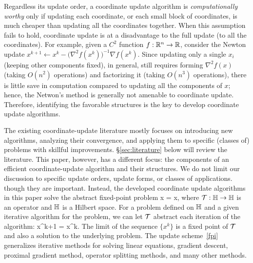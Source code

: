 Regardless its update order, a coordinate update algorithm is \emph{computationally worthy} only if updating each coordinate, or each small block of coordinates, is much cheaper than updating all the coordinates together. When this assumption fails to hold, coordinate update is at a disadvantage to the full update (to all the coordinates). For example, given a $C^2$ function $f:\mathbb{R}^n\to \mathbb{R}$, consider the Newton update  $x^{k+1} \gets x^k - \big(\nabla^2 f(x^k)\big)^{-1}\nabla f(x^k)$. Since updating only a single $x_i$ (keeping other components fixed), in general, still requires forming $\nabla^2 f(x)$ (taking $O(n^2)$ operations) and factorizing it (taking $O(n^3)$ operations), there is little save in computation compared to updating all the components of $x$; hence, the Netwon's method is generally not amenable to coordinate update.  Therefore, identifying the favorable structures is the key to develop coordinate update algorithms.

The existing coordinate-update literature mostly focuses on introducing new algorithms, analyzing their convergence, and applying them to specific (classes of) problems with skillful improvements. \S\ref{sec:literature} below will review the literature. This paper, however, has a different focus:  the  components of  an efficient coordinate-update algorithm and their structures. We do not limit our discussion to specific update orders, update forms,  or classes of applications.  though they are important. Instead,   
the developed coordinate update algorithms in this paper %
solve the abstract fixed-point problem
\beq\label{fpprob}
x = \cT x,
\eeq
where  ${\mathcal{T}}:\mathbb{H} \to \mathbb{H}$ is an operator and $\mathbb{H}$ is a Hilbert space. 
For a  problem defined on $\mathbb{H}$ and a given iterative algorithm for the problem,  we can let  ${\mathcal{T}}$ abstract each iteration of the algorithm:
\beq\label{fpi}
x^{k+1} = \cT x^k.
\eeq
The limit of the sequence $\{x^k\}$  is a fixed point of ${\mathcal{T}}$ and also a solution to the underlying problem. The update scheme~\eqref{fpi} generalizes iterative methods for solving linear equations, gradient descent, proximal gradient method,  operator splitting methods, and many other methods.

